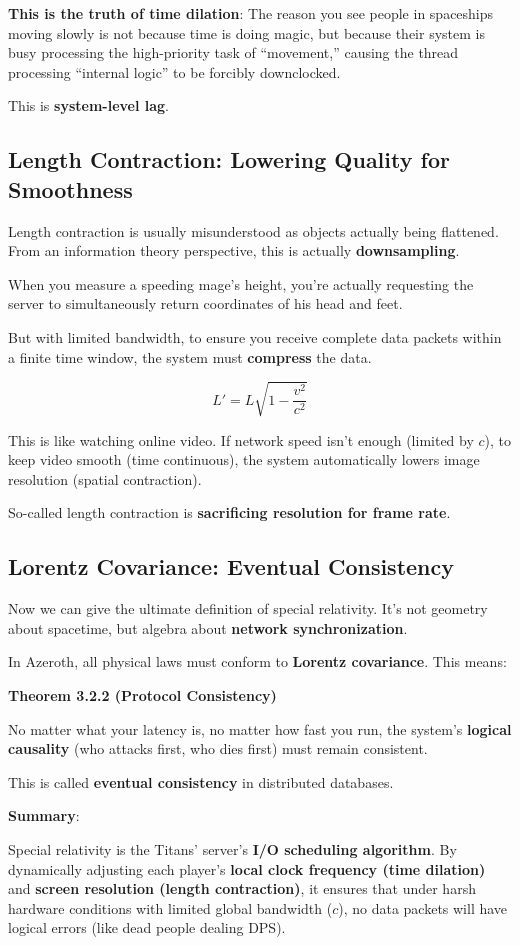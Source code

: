 \textbf{This is the truth of time dilation}: The reason you see people in spaceships moving slowly is not because time is doing magic, but because their system is busy processing the high-priority task of ``movement,'' causing the thread processing ``internal logic'' to be forcibly downclocked.

This is \textbf{system-level lag}.

\subsection{Length Contraction: Lowering Quality for Smoothness}

Length contraction is usually misunderstood as objects actually being flattened. From an information theory perspective, this is actually \textbf{downsampling}.

When you measure a speeding mage's height, you're actually requesting the server to simultaneously return coordinates of his head and feet.

But with limited bandwidth, to ensure you receive complete data packets within a finite time window, the system must \textbf{compress} the data.

\[
L' = L \sqrt{1 - \frac{v^2}{c^2}}
\]

This is like watching online video. If network speed isn't enough (limited by $c$), to keep video smooth (time continuous), the system automatically lowers image resolution (spatial contraction).

So-called length contraction is \textbf{sacrificing resolution for frame rate}.

\subsection{Lorentz Covariance: Eventual Consistency}

Now we can give the ultimate definition of special relativity. It's not geometry about spacetime, but algebra about \textbf{network synchronization}.

In Azeroth, all physical laws must conform to \textbf{Lorentz covariance}. This means:

\textbf{Theorem 3.2.2 (Protocol Consistency)}

No matter what your latency is, no matter how fast you run, the system's \textbf{logical causality} (who attacks first, who dies first) must remain consistent.

This is called \textbf{eventual consistency} in distributed databases.

\textbf{Summary}:

Special relativity is the Titans' server's \textbf{I/O scheduling algorithm}. By dynamically adjusting each player's \textbf{local clock frequency (time dilation)} and \textbf{screen resolution (length contraction)}, it ensures that under harsh hardware conditions with limited global bandwidth ($c$), no data packets will have logical errors (like dead people dealing DPS).
